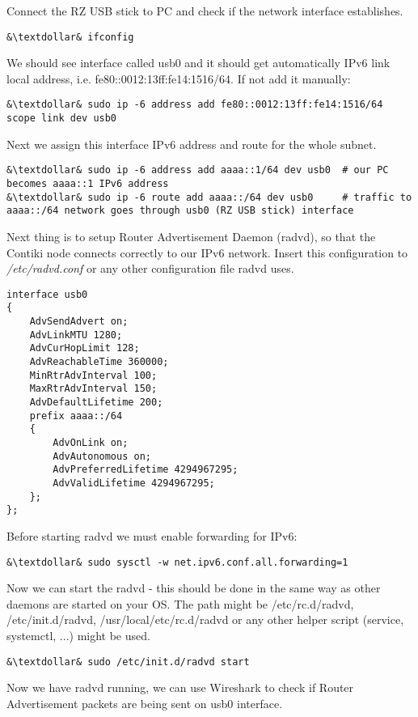 \documentclass{article}
\begin{document}
Connect the RZ USB stick to PC and check if the network interface establishes.
\begin{lstlisting}
&\textdollar& ifconfig
\end{lstlisting}

We should see interface called usb0 and it should get automatically IPv6 link local address, i.e. fe80::0012:13ff:fe14:1516/64.
If not add it manually:
\begin{lstlisting}
&\textdollar& sudo ip -6 address add fe80::0012:13ff:fe14:1516/64 scope link dev usb0
\end{lstlisting}
Next we assign this interface IPv6 address and route for the whole subnet.
\begin{lstlisting}
&\textdollar& sudo ip -6 address add aaaa::1/64 dev usb0  # our PC becomes aaaa::1 IPv6 address
&\textdollar& sudo ip -6 route add aaaa::/64 dev usb0     # traffic to aaaa::/64 network goes through usb0 (RZ USB stick) interface
\end{lstlisting}

Next thing is to setup Router Advertisement Daemon (radvd), so that the Contiki node connects correctly to our IPv6 network.
Insert this configuration to {\it{/etc/radvd.conf}} or any other configuration file radvd uses.
\begin{lstlisting}
interface usb0
{
    AdvSendAdvert on;
    AdvLinkMTU 1280;
    AdvCurHopLimit 128;
    AdvReachableTime 360000;
    MinRtrAdvInterval 100;
    MaxRtrAdvInterval 150;
    AdvDefaultLifetime 200;
    prefix aaaa::/64
    {
        AdvOnLink on;
        AdvAutonomous on;
        AdvPreferredLifetime 4294967295; 
        AdvValidLifetime 4294967295; 
    };
};
\end{lstlisting}
Before starting radvd we must enable forwarding for IPv6:
\begin{lstlisting}
&\textdollar& sudo sysctl -w net.ipv6.conf.all.forwarding=1
\end{lstlisting}
Now we can start the radvd - this should be done in the same way as other daemons are started on your OS.
The path might be /etc/rc.d/radvd, /etc/init.d/radvd, /usr/local/etc/rc.d/radvd or any other helper script (service, systemctl, ...) might be used.
\begin{lstlisting}
&\textdollar& sudo /etc/init.d/radvd start
\end{lstlisting}

Now we have radvd running, we can use Wireshark to check if Router Advertisement packets are being sent on usb0 interface.
\end{document}
